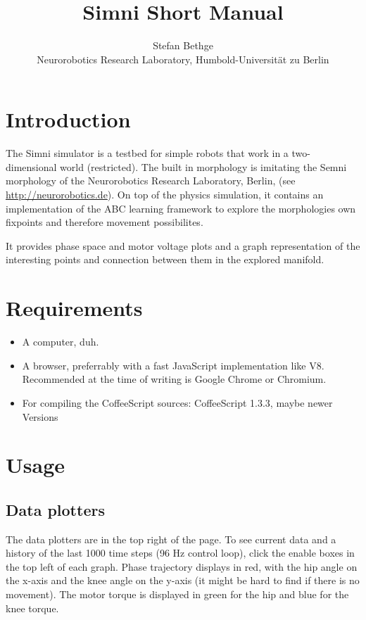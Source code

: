 \documentclass[10pt,a4paper]{article}
\begin{document}
\title{Simni Short Manual}
\author{Stefan Bethge\\
Neurorobotics Research Laboratory, Humbold-Universität zu Berlin}

\maketitle
\tableofcontents
\newpage
{}

\section{Introduction}

The Simni simulator is a testbed for simple robots that work in a two-dimensional world (restricted). The built in morphology is imitating the Semni morphology of the Neurorobotics Research Laboratory, Berlin, (see \url{http://neurorobotics.de}).
On top of the physics simulation, it contains an implementation of the ABC learning framework to explore the morphologies own fixpoints and therefore movement possibilites.

It provides phase space and motor voltage plots and a graph representation of the interesting points and connection between them in the explored manifold.

\section{Requirements}

\begin{itemize}
\item A computer, duh.
\item A browser, preferrably with a fast JavaScript implementation like V8. Recommended at the time of writing is Google Chrome or Chromium.
\item For compiling the CoffeeScript sources: CoffeeScript 1.3.3, maybe newer Versions

\end{itemize}

\section{Usage}

\subsection{Data plotters}

The data plotters are in the top right of the page.
To see current data and a history of the last 1000 time steps (96 Hz control loop), click the enable boxes in the top left of each graph. Phase trajectory displays in red, with the hip angle on the x-axis and the knee angle on the y-axis (it might be hard to find if there is no movement). The motor torque is displayed in green for the hip and blue for the knee torque.
\end{document}
